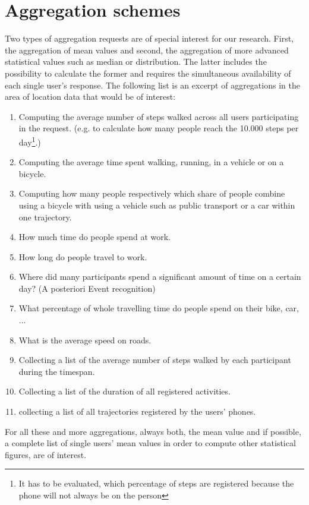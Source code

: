  \section{Aggregation schemes}\label{aggregation-schemes}
 Two types of aggregation requests are of special interest for our research. First, the aggregation of mean values and second, the aggregation of more advanced statistical values such as median or distribution. The latter includes the possibility to calculate the former and requires the simultaneous availability of each single user's response. %
 The following list is an excerpt of aggregations in the area of location data that would be of interest:
 \begin{enumerate}
 	\item Computing the average number of steps walked across all users participating in the request. (e.g. to calculate how many people reach the 10.000 steps per day\footnote{It has to be evaluated, which percentage of steps are registered because the phone will not always be on the person}.)
	\item Computing the average time spent walking, running, in a vehicle or on a bicycle.
	\item Computing how many people respectively which share of people combine using a bicycle with using a vehicle such as public transport or a car within one trajectory.
	\item How much time do people spend at work.
	\item How long do people travel to work.
	\item Where did many participants spend a significant amount of time on a certain day? (A posteriori Event recognition)
	\item What percentage of whole travelling time do people spend on their bike, car, ...
	\item What is the average speed on roads.

	\item Collecting a list of the average number of steps walked by each participant during the timespan.
	\item Collecting a list of the duration of all registered activities.

	\item collecting a list of all trajectories registered by the users' phones.
 \end{enumerate}
 For all these and more aggregations, always both, the mean value and if possible, a complete list of single users' mean values in order to compute other statistical figures, are of interest.

